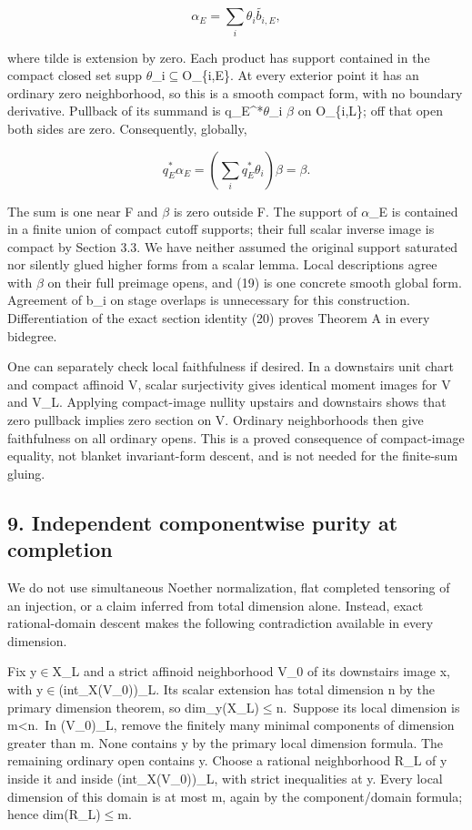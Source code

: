 \documentclass[
  10pt,
]{article}
\begin{document}
\[
             \alpha_E=\sum_i\widetilde{\theta_i b_{i,E}},    \tag{19}
\]

where tilde is extension by zero. Each product has support contained in
the compact closed set supp \ensuremath{\theta}\_i\ensuremath{\subseteq}O\_\{i,E\}. At every exterior point it
has an ordinary zero neighborhood, so this is a smooth compact form,
with no boundary derivative. Pullback of its summand is q\_E\^{}*\ensuremath{\theta}\_i \ensuremath{\beta}
on O\_\{i,L\}; off that open both sides are zero. Consequently,
globally,

\[
           q_E^*\alpha_E=(\sum_i q_E^*\theta_i)\beta=\beta.  \tag{20}
\]

The sum is one near F and \ensuremath{\beta} is zero outside F. The support of \ensuremath{\alpha}\_E is
contained in a finite union of compact cutoff supports; their full
scalar inverse image is compact by Section 3.3. We have neither assumed
the original support saturated nor silently glued higher forms from a
scalar lemma. Local descriptions agree with \ensuremath{\beta} on their full preimage
opens, and (19) is one concrete smooth global form. Agreement of b\_i on
stage overlaps is unnecessary for this construction. Differentiation of
the exact section identity (20) proves Theorem A in every bidegree.

One can separately check local faithfulness if desired. In a downstairs
unit chart and compact affinoid V, scalar surjectivity gives identical
moment images for V and V\_L. Applying compact-image nullity upstairs
and downstairs shows that zero pullback implies zero section on V.
Ordinary neighborhoods then give faithfulness on all ordinary opens.
This is a proved consequence of compact-image equality, not blanket
invariant-form descent, and is not needed for the finite-sum gluing.

\subsection{9. Independent componentwise purity at
completion}\label{independent-componentwise-purity-at-completion}

We do not use simultaneous Noether normalization, flat completed
tensoring of an injection, or a claim inferred from total dimension
alone. Instead, exact rational-domain descent makes the following
contradiction available in every dimension.

Fix y\ensuremath{\in}X\_L and a strict affinoid neighborhood V\_0 of its downstairs
image x, with y\ensuremath{\in}(int\_X(V\_0))\_L. Its scalar extension has total
dimension n by the primary dimension theorem, so dim\_y(X\_L)\ensuremath{\le}n.~Suppose
its local dimension is m\textless n.~In (V\_0)\_L, remove the finitely
many minimal components of dimension greater than m. None contains y by
the primary local dimension formula. The remaining ordinary open
contains y. Choose a rational neighborhood R\_L of y inside it and
inside (int\_X(V\_0))\_L, with strict inequalities at y. Every local
dimension of this domain is at most m, again by the component/domain
formula; hence dim(R\_L)\ensuremath{\le}m.
\end{document}
